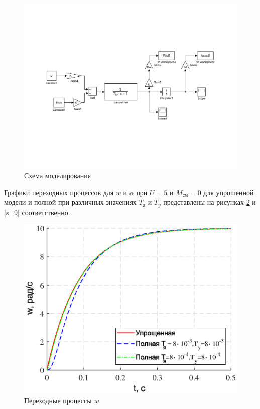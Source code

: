 \documentclass[a4paper,12pt]{article}
\begin{document}
	\begin{figure}[h]
		\renewcommand{\figurename}{Рисунок}
		\centering
		\includegraphics[width=6in]{Lab10Simple2.pdf}
		\caption{Схема моделирования}
		\label{s_7}
	\end{figure}
	\newpage
	Графики переходных процессов для $w$ и $\alpha$ при $U=5$ и $M_{\text{см}}=0$ для упрошенной модели и полной при различных значениях $T_{\text{я}}$ и $T_y$ представлены на рисунках \ref{s_8} и \ref{s_9} соответственно.
	\begin{figure}[h!]
		
		
				\centering
				\includegraphics[width=5in]{comparew.eps}
				\caption{Переходные процессы $w$} 
				\label{s_8} 
					\end{figure}
\end{document}
